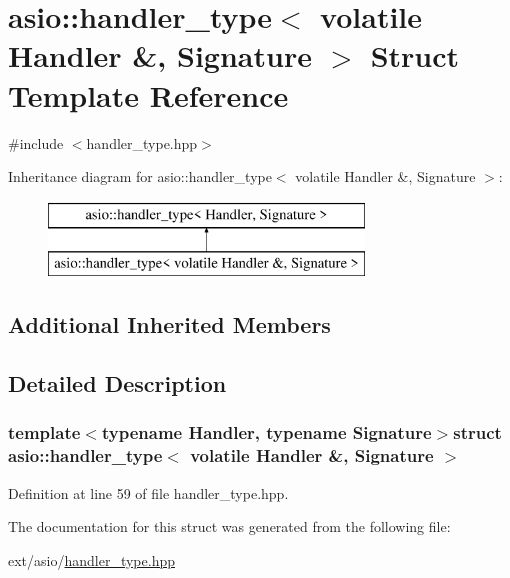 \hypertarget{structasio_1_1handler__type_3_01volatile_01_handler_01_6_00_01_signature_01_4}{}\section{asio\+:\+:handler\+\_\+type$<$ volatile Handler \&, Signature $>$ Struct Template Reference}
\label{structasio_1_1handler__type_3_01volatile_01_handler_01_6_00_01_signature_01_4}


{\ttfamily \#include $<$handler\+\_\+type.\+hpp$>$}

Inheritance diagram for asio\+:\+:handler\+\_\+type$<$ volatile Handler \&, Signature $>$\+:\begin{figure}[H]
\begin{center}
\leavevmode
\includegraphics[height=2.000000cm]{structasio_1_1handler__type_3_01volatile_01_handler_01_6_00_01_signature_01_4}
\end{center}
\end{figure}
\subsection*{Additional Inherited Members}


\subsection{Detailed Description}
\subsubsection*{template$<$typename Handler, typename Signature$>$struct asio\+::handler\+\_\+type$<$ volatile Handler \&, Signature $>$}



Definition at line 59 of file handler\+\_\+type.\+hpp.



The documentation for this struct was generated from the following file\+:\begin{DoxyCompactItemize}
\item 
ext/asio/\hyperlink{handler__type_8hpp}{handler\+\_\+type.\+hpp}\end{DoxyCompactItemize}
